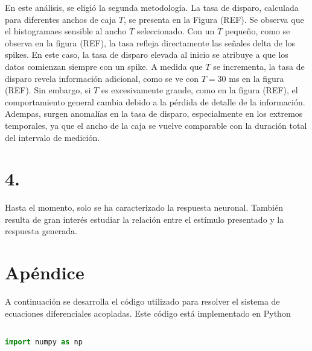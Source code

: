 \documentclass[aps,prb,twocolumn,superscriptaddress,floatfix,longbibliography]{revtex4-2}
\newcounter{para}
\begin{document}
En este análisis, se eligió la segunda metodología. La tasa de disparo, calculada para diferentes anchos de caja \(T\), se presenta en la Figura (REF). Se observa que el histogramaes sensible al ancho \(T\) seleccionado. Con un \(T\) pequeño, como se observa en la figura (REF), la tasa refleja directamente las señales delta de los spikes. En este caso, la tasa de disparo elevada al inicio se atribuye a que los datos comienzan siempre con un spike. A medida que \(T\) se incrementa, la tasa de disparo revela información adicional, como se ve con \(T = 30\) ms en la figura (REF). Sin embargo, si \(T\) es excesivamente grande, como en la figura (REF), el comportamiento general cambia debido a la pérdida de detalle de la información. Adempas, surgen anomalías en la tasa de disparo, especialmente en los extremos temporales, ya que el ancho de la caja se vuelve comparable con la duración total del intervalo de medición.


\section{4.}

Hasta el momento, solo se ha caracterizado la respuesta neuronal. También resulta de gran interés estudiar la relación entre el estímulo presentado y la respuesta generada. 

\onecolumngrid

\section{Apéndice}

A continuación se desarrolla el código utilizado para resolver el sistema de ecuaciones diferenciales acopladas. Este código está implementado en Python

\begin{lstlisting}[language=Python]

import numpy as np


\end{lstlisting}


\end{document}
